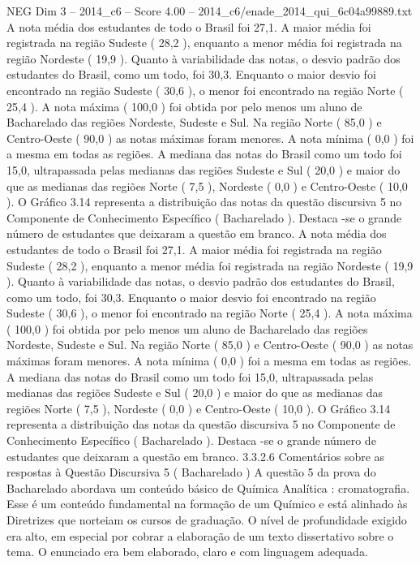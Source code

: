 \begin{textsample}{NEG Dim 3 – 2014\_c6 – Score 4.00 – 2014\_c6/enade\_2014\_qui\_6c04a99889.txt}
A nota média dos estudantes de todo o Brasil foi 27,1.
A maior média foi registrada na região Sudeste ( 28,2 ), enquanto a menor média foi registrada na região Nordeste ( 19,9 ).
Quanto à variabilidade das notas, o desvio padrão dos estudantes do Brasil, como um todo, foi 30,3.
Enquanto o maior desvio foi encontrado na região Sudeste ( 30,6 ), o menor foi encontrado na região Norte ( 25,4 ).
A nota máxima ( 100,0 ) foi obtida por pelo menos um aluno de Bacharelado das regiões Nordeste, Sudeste e Sul.
Na região Norte ( 85,0 ) e Centro-Oeste ( 90,0 ) as notas máximas foram menores.
A nota mínima ( 0,0 ) foi a mesma em todas as regiões.
A mediana das notas do Brasil como um todo foi 15,0, ultrapassada pelas medianas das regiões Sudeste e Sul ( 20,0 ) e maior do que as medianas das regiões Norte ( 7,5 ), Nordeste ( 0,0 ) e Centro-Oeste ( 10,0 ).
O Gráfico 3.14 representa a distribuição das notas da questão discursiva 5 no Componente de Conhecimento Específico ( Bacharelado ).
Destaca -se o grande número de estudantes que deixaram a questão em branco.
A nota média dos estudantes de todo o Brasil foi 27,1.
A maior média foi registrada na região Sudeste ( 28,2 ), enquanto a menor média foi registrada na região Nordeste ( 19,9 ).
Quanto à variabilidade das notas, o desvio padrão dos estudantes do Brasil, como um todo, foi 30,3.
Enquanto o maior desvio foi encontrado na região Sudeste ( 30,6 ), o menor foi encontrado na região Norte ( 25,4 ).
A nota máxima ( 100,0 ) foi obtida por pelo menos um aluno de Bacharelado das regiões Nordeste, Sudeste e Sul.
Na região Norte ( 85,0 ) e Centro-Oeste ( 90,0 ) as notas máximas foram menores.
A nota mínima ( 0,0 ) foi a mesma em todas as regiões.
A mediana das notas do Brasil como um todo foi 15,0, ultrapassada pelas medianas das regiões Sudeste e Sul ( 20,0 ) e maior do que as medianas das regiões Norte ( 7,5 ), Nordeste ( 0,0 ) e Centro-Oeste ( 10,0 ).
O Gráfico 3.14 representa a distribuição das notas da questão discursiva 5 no Componente de Conhecimento Específico ( Bacharelado ).
Destaca -se o grande número de estudantes que deixaram a questão em branco. 3.3.2.6 Comentários sobre as respostas à Questão Discursiva 5 ( Bacharelado ) A questão 5 da prova do Bacharelado abordava um conteúdo básico de Química Analítica : cromatografia.
Esse é um conteúdo fundamental na formação de um Químico e está alinhado às Diretrizes que norteiam os cursos de graduação.
O nível de profundidade exigido era alto, em especial por cobrar a elaboração de um texto dissertativo sobre o tema.
O enunciado era bem elaborado, claro e com linguagem adequada.

\end{textsample}
